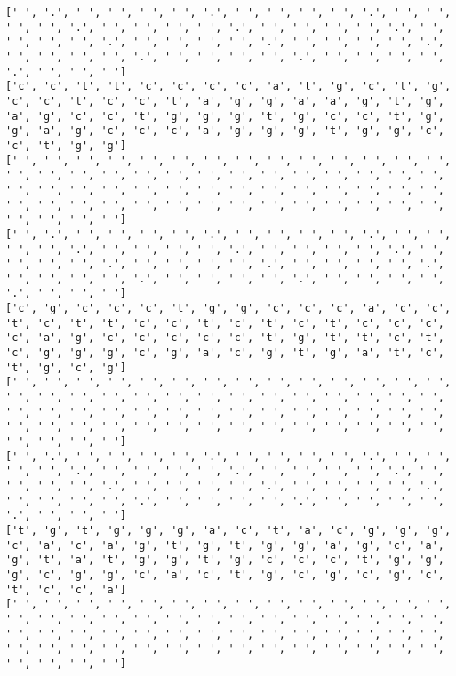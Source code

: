 \documentclass{article}
\begin{document}
\begin{Verbatim}
[' ', '.', ' ', ' ', ' ', ' ', '.', ' ', ' ', ' ', ' ', '.', ' ', ' ', ' ', ' ', '.', ' ', ' ', ' ', ' ', '.', ' ', ' ', ' ', ' ', '.', ' ', ' ', ' ', ' ', '.', ' ', ' ', ' ', ' ', '.', ' ', ' ', ' ', ' ', '.', ' ', ' ', ' ', ' ', '.', ' ', ' ', ' ', ' ', '.', ' ', ' ', ' ', ' ', '.', ' ', ' ', ' ']
['c', 'c', 't', 't', 'c', 'c', 'c', 'c', 'a', 't', 'g', 'c', 't', 'g', 'c', 'c', 't', 'c', 'c', 't', 'a', 'g', 'g', 'a', 'a', 'g', 't', 'g', 'a', 'g', 'c', 'c', 't', 'g', 'g', 'g', 't', 'g', 'c', 'c', 't', 'g', 'g', 'a', 'g', 'c', 'c', 'c', 'a', 'g', 'g', 'g', 't', 'g', 'g', 'c', 'c', 't', 'g', 'g']
[' ', ' ', ' ', ' ', ' ', ' ', ' ', ' ', ' ', ' ', ' ', ' ', ' ', ' ', ' ', ' ', ' ', ' ', ' ', ' ', ' ', ' ', ' ', ' ', ' ', ' ', ' ', ' ', ' ', ' ', ' ', ' ', ' ', ' ', ' ', ' ', ' ', ' ', ' ', ' ', ' ', ' ', ' ', ' ', ' ', ' ', ' ', ' ', ' ', ' ', ' ', ' ', ' ', ' ', ' ', ' ', ' ', ' ', ' ', ' ']
[' ', '.', ' ', ' ', ' ', ' ', '.', ' ', ' ', ' ', ' ', '.', ' ', ' ', ' ', ' ', '.', ' ', ' ', ' ', ' ', '.', ' ', ' ', ' ', ' ', '.', ' ', ' ', ' ', ' ', '.', ' ', ' ', ' ', ' ', '.', ' ', ' ', ' ', ' ', '.', ' ', ' ', ' ', ' ', '.', ' ', ' ', ' ', ' ', '.', ' ', ' ', ' ', ' ', '.', ' ', ' ', ' ']
['c', 'g', 'c', 'c', 'c', 't', 'g', 'g', 'c', 'c', 'c', 'a', 'c', 'c', 't', 'c', 't', 't', 'c', 'c', 't', 'c', 't', 'c', 't', 'c', 'c', 'c', 'c', 'a', 'g', 'c', 'c', 'c', 'c', 'c', 't', 'g', 't', 't', 'c', 't', 'c', 'g', 'g', 'g', 'c', 'g', 'a', 'c', 'g', 't', 'g', 'a', 't', 'c', 't', 'g', 'c', 'g']
[' ', ' ', ' ', ' ', ' ', ' ', ' ', ' ', ' ', ' ', ' ', ' ', ' ', ' ', ' ', ' ', ' ', ' ', ' ', ' ', ' ', ' ', ' ', ' ', ' ', ' ', ' ', ' ', ' ', ' ', ' ', ' ', ' ', ' ', ' ', ' ', ' ', ' ', ' ', ' ', ' ', ' ', ' ', ' ', ' ', ' ', ' ', ' ', ' ', ' ', ' ', ' ', ' ', ' ', ' ', ' ', ' ', ' ', ' ', ' ']
[' ', '.', ' ', ' ', ' ', ' ', '.', ' ', ' ', ' ', ' ', '.', ' ', ' ', ' ', ' ', '.', ' ', ' ', ' ', ' ', '.', ' ', ' ', ' ', ' ', '.', ' ', ' ', ' ', ' ', '.', ' ', ' ', ' ', ' ', '.', ' ', ' ', ' ', ' ', '.', ' ', ' ', ' ', ' ', '.', ' ', ' ', ' ', ' ', '.', ' ', ' ', ' ', ' ', '.', ' ', ' ', ' ']
['t', 'g', 't', 'g', 'g', 'g', 'a', 'c', 't', 'a', 'c', 'g', 'g', 'g', 'c', 'a', 'c', 'a', 'g', 't', 'g', 't', 'g', 'g', 'a', 'g', 'c', 'a', 'g', 't', 'a', 't', 'g', 'g', 't', 'g', 'c', 'c', 'c', 't', 'g', 'g', 'g', 'c', 'g', 'g', 'c', 'a', 'c', 't', 'g', 'c', 'g', 'c', 'g', 'c', 't', 'c', 'c', 'a']
[' ', ' ', ' ', ' ', ' ', ' ', ' ', ' ', ' ', ' ', ' ', ' ', ' ', ' ', ' ', ' ', ' ', ' ', ' ', ' ', ' ', ' ', ' ', ' ', ' ', ' ', ' ', ' ', ' ', ' ', ' ', ' ', ' ', ' ', ' ', ' ', ' ', ' ', ' ', ' ', ' ', ' ', ' ', ' ', ' ', ' ', ' ', ' ', ' ', ' ', ' ', ' ', ' ', ' ', ' ', ' ', ' ', ' ', ' ', ' ']

\end{Verbatim}
\end{document}
